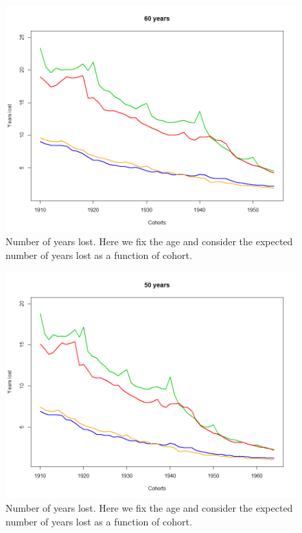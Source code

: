               \begin{figure}[tbh]
             \centering
              \includegraphics[width=0.8\linewidth]{figures/antal_tapteAA_age60.png}
              \caption{Number of years lost. Here we fix the age and consider the expected number of years lost as a function of cohort.}
              \label{fig:Number years lost max years60 }
            \end{figure}          
                 
            
            
            
            
                                 
              \begin{figure}[tbh]
             \centering
              \includegraphics[width=0.8\linewidth]{figures/antal_tapteAA_age50.png}
              \caption{Number of years lost. Here we fix the age and consider the expected number of years lost as a function of cohort.}
              \label{fig:Number years lost max years50 }
            \end{figure}          
               
